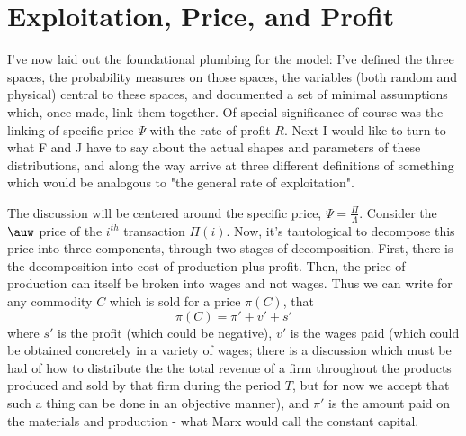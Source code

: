 \documentclass{article}
\theoremstyle{definition}
\theoremstyle{plain}
\theoremstyle{theorem}
\begin{document}
\section{Exploitation, Price, and Profit}
I've now laid out the foundational plumbing for the model: I've defined the three spaces, the probability measures on those spaces, the variables (both random and physical) central to these spaces, and documented a set of minimal assumptions which, once made, link them together. Of special significance of course was the linking of specific price $\Psi$ with the rate of profit $R$. Next I would like to turn to what F and J have to say about the actual shapes and parameters of these distributions, and along the way arrive at three different definitions of something which would be analogous to "the general rate of exploitation". \par 
The discussion will be centered around the specific price, $\Psi = \frac{\Pi}{\Lambda}$. Consider the $\auw$ price of the $i^{th}$ transaction $\Pi(i)$. Now, it's tautological to decompose this price into three components, through two stages of decomposition. First, there is the decomposition into cost of production plus profit. Then, the price of production can itself be broken into wages and not wages. Thus we can write for any commodity $C$ which is sold for a price $\pi(C)$, that
\[ \pi(C) = \pi' + v' + s' \]
where $s'$ is the profit (which could be negative), $v'$ is the wages paid (which could be obtained concretely in a variety of wages; there is a discussion which must be had of how to distribute the the total revenue of a firm throughout the products produced and sold by that firm during the period $T$, but for now we accept that such a thing can be done in an objective manner), and $\pi'$ is the amount paid on the materials and production - what Marx would call the constant capital. \par 
\end{document}
